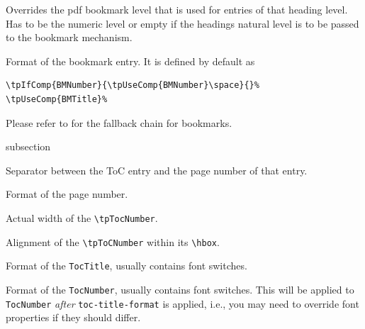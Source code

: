 %

Overrides the pdf bookmark level that is used for entries of that
heading level. Has to be the numeric level or empty if the headings
natural level is to be passed to the bookmark mechanism.


Format of the bookmark entry. It is defined by default as
\begin{lstlisting}[style=tex]
\tpIfComp{BMNumber}{\tpUseComp{BMNumber}\space}{}%
\tpUseComp{BMTitle}%
\end{lstlisting}
Please refer to  for the fallback
chain for bookmarks.

\begin{heading}[label=sec:hdg:toc]{subsection}
\end{heading}


Separator between the ToC entry and the page number of that entry.


Format of the page number.



Actual width of the \lstinline{\tpTocNumber}.


Alignment of the \lstinline{\tpToCNumber} within its
\lstinline{\hbox}.


Format of the \texttt{TocTitle}, usually contains font switches.


Format of the \texttt{TocNumber}, usually contains font switches. This
will be applied to \texttt{TocNumber} \textit{after}
\texttt{toc-title-format} is applied, i.e., you may need to override
font properties if they should differ.


